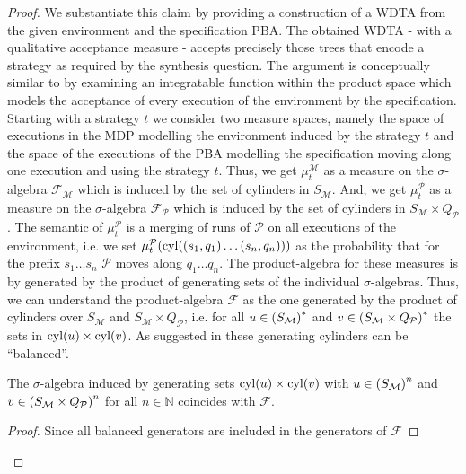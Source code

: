 \begin{proof}
We substantiate this claim by providing a construction of a \ac{WDTA} from the
given environment and the specification \ac{PBA}. The obtained \ac{WDTA} - with
a qualitative acceptance measure - accepts precisely those trees that encode a
strategy as required by the synthesis question.
The argument is conceptually similar to \cite[Proposition 43]{RandAutoInfTrees}
by examining an integratable function within the product space which models
the acceptance of every execution of the environment by the specification.
Starting with a strategy $t$ we consider two measure spaces, namely the space
of executions in the \ac{MDP} modelling the environment induced by the strategy
$t$ and the space of the executions of the \ac{PBA} modelling the
specification moving along one execution and using the strategy $t$.
Thus, we get $\mu^{\mathcal{M}}_{t}$ as a measure on the $\sigma$-algebra
$\mathcal{F}_{\mathcal{M}}$ which is induced by the set of cylinders in
$S_{\mathcal{M}}$. And, we get $\mu^{\mathcal{P}}_{t}$ as a measure on the
$\sigma$-algebra $\mathcal{F}_{\mathcal{P}}$ which is induced
by the set of cylinders in $S_{\mathcal{M}}\times Q_{\mathcal{P}}$. The
semantic of $\mu^{\mathcal{P}}_{t}$ is a merging of runs of
$\mathcal{P}$ on all executions of the environment, i.e. we set
$\mu^{\mathcal{P}}_{t}(\operatorname{cyl}(\left(s_{1}, q_{1}\right)\dots\left(s_{n}, q_{n}\right)))$
as the probability that for the prefix $s_{1}\dots s_{n}$ $\mathcal{P}$
moves along $q_{1}\dots q_{n}$. The product-algebra for these measures is
by \cite[Theorem 22.1]{Bauer} generated by the product of generating sets of
the individual $\sigma$-algebras. Thus, we can understand the product-algebra
$\mathcal{F}$ as the one generated by the product of cylinders over
$S_{\mathcal{M}}$ and $S_{\mathcal{M}}\times Q_{\mathcal{P}}$, i.e. for all
$u\in \left(S_{\mathcal{M}}\right)^{*}$ and
$v\in \left(S_{\mathcal{M}}\times Q_{\mathcal{P}}\right)^{*}$ the sets in
$\operatorname{cyl}(u)\times\operatorname{cyl}(v)$. As suggested in \cite[Remark 35]{RandAutoInfTrees}
these generating cylinders can be \enquote{balanced}.
\begin{lemma}
  The $\sigma$-algebra induced by generating sets $\operatorname{cyl}(u)\times\operatorname{cyl}(v)$ with
  $u\in \left(S_{\mathcal{M}}\right)^{n}$ and
  $v\in \left(S_{\mathcal{M}}\times Q_{\mathcal{P}}\right)^{n}$ for all
  $n\in\mathbb{N}$ coincides with $\mathcal{F}$.
  \label{lem:balanced}
\end{lemma}
\begin{proof}
  Since all balanced generators are included in the generators of $\mathcal{F}$

\end{proof}
\end{proof}
